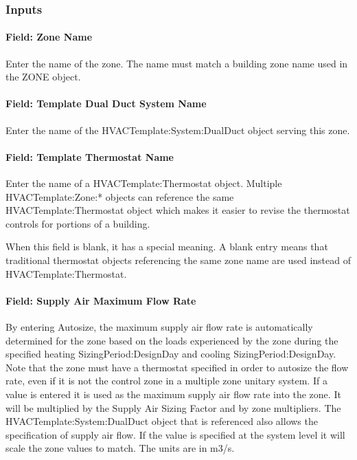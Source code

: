 \subsubsection{Inputs}\label{inputs-13-005}

\paragraph{Field: Zone Name}\label{field-zone-name-12}

Enter the name of the zone. The name must match a building zone name used in the ZONE object.

\paragraph{Field: Template Dual Duct System Name}\label{field-template-dual-duct-system-name}

Enter the name of the HVACTemplate:System:DualDuct object serving this zone.

\paragraph{Field: Template Thermostat Name}\label{field-template-thermostat-name-12}

Enter the name of a HVACTemplate:Thermostat object. Multiple HVACTemplate:Zone:* objects can reference the same HVACTemplate:Thermostat object which makes it easier to revise the thermostat controls for portions of a building.

When this field is blank, it has a special meaning. A blank entry means that traditional thermostat objects referencing the same zone name are used instead of HVACTemplate:Thermostat.

\paragraph{Field: Supply Air Maximum Flow Rate}\label{field-supply-air-maximum-flow-rate-5}

By entering Autosize, the maximum supply air flow rate is automatically determined for the zone based on the loads experienced by the zone during the specified heating SizingPeriod:DesignDay and cooling SizingPeriod:DesignDay. Note that the zone must have a thermostat specified in order to autosize the flow rate, even if it is not the control zone in a multiple zone unitary system. If a value is entered it is used as the maximum supply air flow rate into the zone. It will be multiplied by the Supply Air Sizing Factor and by zone multipliers. The HVACTemplate:System:DualDuct object that is referenced also allows the specification of supply air flow. If the value is specified at the system level it will scale the zone values to match. The units are in m3/s.

